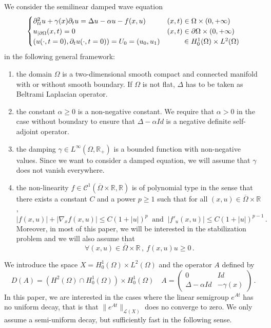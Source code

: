 \documentclass[10pt]{amsart}
\theoremstyle{definition}\newtheorem{defi}[theo]{Definition}\newtheorem{rema}[theo]{Remark}\newtheorem{exam}[theo]{Example}\newtheorem{exem}[theo]{Example}\newtheorem{nota}[theo]{Notation}
\newcommand{\RR}{\mathbb{R}}
\newcommand{\Cc}{\mathcal{C}}
\newcommand{\Lc}{\mathcal{L}}
\newcommand{\grad}{\nabla}
\newcommand*{\romanenumi}{\renewcommand*{\theenumi}{\roman{enumi}}}
\let\oldforall\forall
\renewcommand*{\forall}{\mathrel{\oldforall}}
\begin{document}
We consider the semilinear damped wave equation
\begin{equation}\label{eq}
\begin{cases}
\partial_{tt}^2 u + \gamma(x)\partial_t u = \Delta u - \alpha u - f(x,u)\:&(x,t)\in\Omega\times (0,+\infty)\\
u_{|\partial\Omega}(x,t)=0&(x,t)\in\partial\Omega\times (0,+\infty)\\
\left(u(\cdot,t=0),\partial_t u(\cdot,t=0)\right)=U_0=(u_0,u_1)& \mkern43mu\in H^1_0(\Omega)\times L^2(\Omega)
\end{cases}
\end{equation}
in the following general framework:
\begin{enumerate}\romanenumi
\item \label{listintro1.1}the domain $\Omega$ is a two-dimensional smooth compact and connected manifold with or without smooth boundary. If $\Omega$ is not flat, $\Delta$ has to be taken as Beltrami Laplacian operator.
\item \label{listintro1.2}the constant $\alpha\geq 0$ is a non-negative constant. We require that $\alpha>0$ in the case without boundary to ensure that $\Delta-\alpha Id$ is a negative definite self-adjoint operator.
\item \label{listintro1.3}the damping $\gamma\in L^\infty(\Omega,\RR_+)$ is a bounded function with non-negative values. Since we want to consider a damped equation, we will assume that $\gamma$ does not vanish everywhere.
\item \label{listintro1.4}the non-linearity $f\in\Cc^1(\overline\Omega\times\RR,\RR)$ is of polynomial type in the sense that there exists a constant $C$ and a power $p\geq 1$ such that for all $(x,u)\in \overline\Omega\times\RR$,
\begin{equation}\label{hyp-f-estim}
|f(x,u)|+|\grad_xf(x,u)|\leq C(1+|u|)^p\:\text{ and }\:|f'_u(x,u)|\leq C(1+|u|)^{p-1}\,.
\end{equation}
Moreover, in most of this paper, we will be interested in the stabilization problem and we will also assume that
\begin{equation}\label{hyp-f-sign}
\forall (x,u)\in \overline\Omega\times\RR\,,\:f(x,u)u\geq 0\,.
\end{equation}
\end{enumerate}


We introduce the space $X=H^1_0(\Omega)\times L^2(\Omega)$ and the operator $A$ defined by
\[
D(A)=\left(H^2(\Omega)\cap H^1_0(\Omega)\right)\times H^1_0(\Omega)\quad
A =
\begin{pmatrix}
0 & Id \\
\Delta-\alpha Id & -\gamma(x)
\end{pmatrix}\,.
\]
In this paper, we are interested in the cases where the linear semigroup $e^{At}$ has no uniform decay, that is that $\|e^{At}\|_{\Lc(X)}$ does no converge to zero. We only assume a semi-uniform decay, but sufficiently fast in the following sense.
\end{document}
